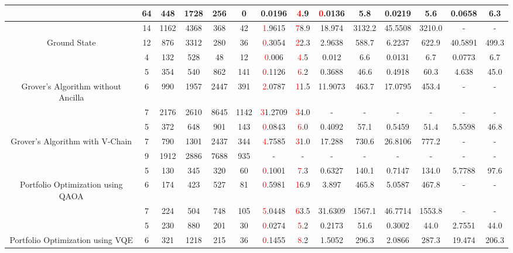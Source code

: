\begin{table}[htb]
{\begin{tabular}{|c|c|c|c|c|c|c|c|c|c|c|c|c|c|}
 & 
64 & 448 & 1728 & 256 & 0
 & 0.0196 & \textcolor{red}4.9
 & \textcolor{red}0.0136 & 5.8
 & 0.0219 & 5.6
 & 0.0658 & 6.3
 \\
\hline
 & 
14 & 1162 & 4368 & 368 & 42
 & \textcolor{red}1.9615 & \textcolor{red}78.9
 & 18.974 & 3132.2
 & 45.5508 & 3210.0
 & - & -
 \\
Ground State & 
12 & 876 & 3312 & 280 & 36
 & \textcolor{red}0.3054 & \textcolor{red}22.3
 & 2.9638 & 588.7
 & 6.2237 & 622.9
 & 40.5891 & 499.3
 \\
 & 
4 & 132 & 528 & 48 & 12
 & \textcolor{red}0.006 & \textcolor{red}4.5
 & 0.012 & 6.6
 & 0.0131 & 6.7
 & 0.0773 & 6.7
 \\
\hline
 & 
5 & 354 & 540 & 862 & 141
 & \textcolor{red}0.1126 & \textcolor{red}6.2
 & 0.3688 & 46.6
 & 0.4918 & 60.3
 & 4.638 & 45.0
 \\
Grover's Algorithm without Ancilla & 
6 & 990 & 1957 & 2447 & 391
 & \textcolor{red}2.0787 & \textcolor{red}11.5
 & 11.9073 & 463.7
 & 17.0795 & 453.4
 & - & -
 \\
 & 
7 & 2176 & 2610 & 8645 & 1142
 & \textcolor{red}31.2709 & \textcolor{red}34.0
 & - & -
 & - & -
 & - & -
 \\
\hline
 & 
5 & 372 & 648 & 901 & 143
 & \textcolor{red}0.0843 & \textcolor{red}6.0
 & 0.4092 & 57.1
 & 0.5459 & 51.4
 & 5.5598 & 46.8
 \\
Grover's Algorithm with V-Chain & 
7 & 790 & 1301 & 2437 & 344
 & \textcolor{red}4.7585 & \textcolor{red}31.0
 & 17.288 & 730.6
 & 26.8106 & 777.2
 & - & -
 \\
 & 
9 & 1912 & 2886 & 7688 & 935
 & - & -
 & - & -
 & - & -
 & - & -
 \\
\hline
 & 
5 & 130 & 345 & 320 & 60
 & \textcolor{red}0.1001 & \textcolor{red}7.3
 & 0.6327 & 140.1
 & 0.7147 & 134.0
 & 5.7788 & 97.6
 \\
Portfolio Optimization using QAOA & 
6 & 174 & 423 & 527 & 81
 & \textcolor{red}0.5981 & \textcolor{red}16.9
 & 3.897 & 465.8
 & 5.0587 & 467.8
 & - & -
 \\
 & 
7 & 224 & 504 & 748 & 105
 & \textcolor{red}5.0448 & \textcolor{red}63.5
 & 31.6309 & 1567.1
 & 46.7714 & 1553.8
 & - & -
 \\
\hline
 & 
5 & 230 & 880 & 201 & 30
 & \textcolor{red}0.0274 & \textcolor{red}5.2
 & 0.2173 & 51.6
 & 0.3002 & 44.0
 & 2.7551 & 44.0
 \\
Portfolio Optimization using VQE & 
6 & 321 & 1218 & 215 & 36
 & \textcolor{red}0.1455 & \textcolor{red}8.2
 & 1.5052 & 296.3
 & 2.0866 & 287.3
 & 19.474 & 206.3

\end{tabular}}
\end{table}
